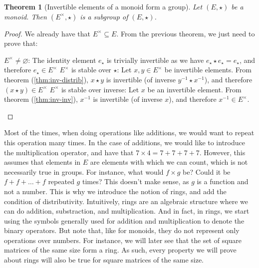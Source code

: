 \documentclass{article}
\newtheorem{theorem}{Theorem}[section]
\theoremstyle{definition}
\theoremstyle{remark}
\theoremstyle{example}
\begin{document}
\begin{theorem}[Invertible elements of a monoid form a group] \label{thm:inv-form-group}
		Let $(E, \star)$ be a monoid. Then $(E^\times, \star)$ is a subgroup of $(E, \star)$. 
\end{theorem}

\begin{proof}
		We already have that $E^\times \subseteq E$. From the previous theorem, we just need to prove that:
		\begin{outline}
				\1 $E^\times \neq \varnothing$: The identity element $e_\star$ is trivially invertible as we have $e_\star \star e_\star = e_\star$, and therefore $e_\star \in E^\times$
				\1 $E^\times$ is stable over $\star$: Let $x, y \in E^\times$ be invertible elements. From theorem (\ref{thm:inv-distrib}), $x \star y$ is invertible (of inverse $y^{-1} \star x^{-1}$), and therefore $(x \star y) \in E^\times$
				\1 $E^\times$ is stable over inverse: Let $x$ be an invertible element. From theorem (\ref{thm:inv-inv}), $x^{-1}$ is invertible (of inverse $x$), and therefore $x^{-1} \in E^\times$.
		\end{outline}
\end{proof}

Most of the times, when doing operations like additions, we would want to repeat this operation many times. In the case of additions, we would like to introduce the multiplication operator, and have that $7 \times 4 = 7 + 7 + 7 + 7$. However, this assumes that elements in $E$ are elements with which we can count, which is not necessarily true in groups. For instance, what would $f \times g$ be? Could it be $f + f + \dots + f$ repeated $g$ times? This doesn't make sense, as $g$ is a function and not a number. This is why we introduce the notion of rings, and add the condition of distributivity. Intuitively, rings are an algebraic structure where we can do addition, substraction, and multiplication. And in fact, in rings, we start using the symbols generally used for addition and multiplication to denote the binary operators. But note that, like for monoids, they do not represent only operations over numbers. For instance, we will later see that the set of square matrices of the same size form a ring. As such, every property we will prove about rings will also be true for square matrices of the same size.
\end{document}

